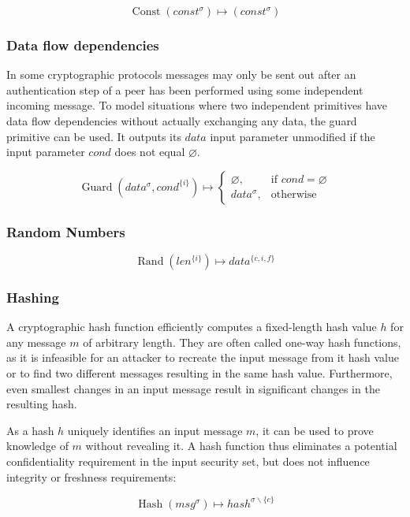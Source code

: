 \documentclass[a4paper]{article}
\DeclareMathOperator{\hash}{Hash}
\DeclareMathOperator{\rand}{Rand}
\DeclareMathOperator{\guard}{Guard}
\DeclareMathOperator{\const}{Const}
\newcommand{\emptysec}{\varnothing}
\newcommand{\secminus}{\smallsetminus}
\begin{document}
$$\const(const^{\sigma}) \mapsto (const^{\sigma})$$

\subsubsection{Data flow dependencies}

In some cryptographic protocols messages may only be sent out after an
authentication step of a peer has been performed using some independent
incoming message. To model situations where two independent primitives have
data flow dependencies without actually exchanging any data, the guard
primitive can be used. It outputs its $data$ input parameter unmodified if the
input parameter $cond$ does not equal $\emptysec$. 

\begin{equation*}
\guard(data^{\sigma}, cond^{\{i\}}) \mapsto
    \begin{cases}
        \emptysec,      & \text{if $cond = \emptysec$} \\
        data^{\sigma},  & \text{otherwise}
    \end{cases}
\end{equation*}

\subsubsection{Random Numbers}

$$\rand(len^{\{i\}}) \mapsto data^{\{c,i,f\}}$$

\subsubsection{Hashing}

A cryptographic hash function efficiently computes a fixed-length hash value
$h$ for any message $m$ of arbitrary length. They are often called one-way hash
functions, as it is infeasible for an attacker to recreate the input message
from it hash value or to find two different messages resulting in the same hash
value. Furthermore, even smallest changes in an input message result in
significant changes in the resulting hash.

As a hash $h$ uniquely identifies an input message $m$, it can be used to prove
knowledge of $m$ without revealing it. A hash function thus eliminates a
potential confidentiality requirement in the input security set, but does not
influence integrity or freshness requirements:

$$\hash(msg^\sigma) \mapsto hash^{\sigma\secminus\{c\}}$$
\end{document}
